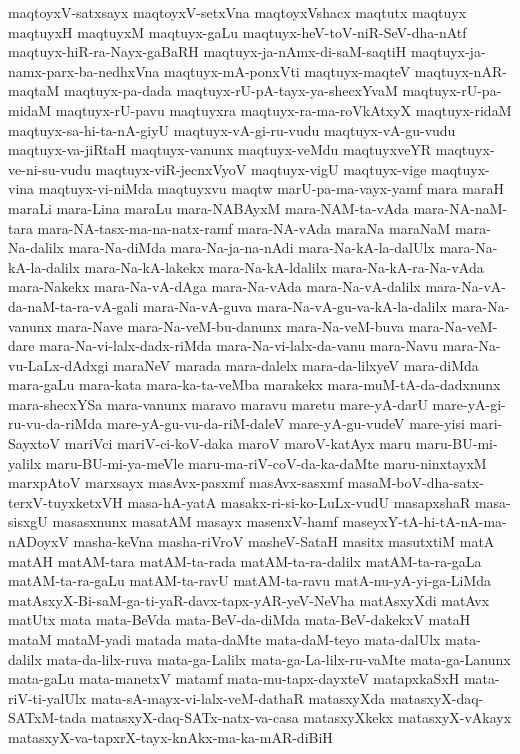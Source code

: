 {maqtoyxV-satxsayx
maqtoyxV-setxVna
maqtoyxVshacx
maqtutx
maqtuyx
maqtuyxH
maqtuyxM
maqtuyx-gaLu
maqtuyx-heV-toV-niR-SeV-dha-nAtf
maqtuyx-hiR-ra-Nayx-gaBaRH
maqtuyx-ja-nAmx-di-saM-saqtiH
maqtuyx-ja-namx-parx-ba-nedhxVna
maqtuyx-mA-ponxVti
maqtuyx-maqteV
maqtuyx-nAR-maqtaM
maqtuyx-pa-dada
maqtuyx-rU-pA-tayx-ya-shecxYvaM
maqtuyx-rU-pa-midaM
maqtuyx-rU-pavu
maqtuyxra
maqtuyx-ra-ma-roVkAtxyX
maqtuyx-ridaM
maqtuyx-sa-hi-ta-nA-giyU
maqtuyx-vA-gi-ru-vudu
maqtuyx-vA-gu-vudu
maqtuyx-va-jiRtaH
maqtuyx-vanunx
maqtuyx-veMdu
maqtuyxveYR
maqtuyx-ve-ni-su-vudu
maqtuyx-viR-jecnxVyoV
maqtuyx-vigU
maqtuyx-vige
maqtuyx-vina
maqtuyx-vi-niMda
maqtuyxvu
maqtw
marU-pa-ma-vayx-yamf
mara
maraH
maraLi
mara-Lina
maraLu
mara-NABAyxM
mara-NAM-ta-vAda
mara-NA-naM-tara
mara-NA-tasx-ma-na-natx-ramf
mara-NA-vAda
maraNa
maraNaM
mara-Na-dalilx
mara-Na-diMda
mara-Na-ja-na-nAdi
mara-Na-kA-la-dalUlx
mara-Na-kA-la-dalilx
mara-Na-kA-lakekx
mara-Na-kA-ldalilx
mara-Na-kA-ra-Na-vAda
mara-Nakekx
mara-Na-vA-dAga
mara-Na-vAda
mara-Na-vA-dalilx
mara-Na-vA-da-naM-ta-ra-vA-gali
mara-Na-vA-guva
mara-Na-vA-gu-va-kA-la-dalilx
mara-Na-vanunx
mara-Nave
mara-Na-veM-bu-danunx
mara-Na-veM-buva
mara-Na-veM-dare
mara-Na-vi-lalx-dadx-riMda
mara-Na-vi-lalx-da-vanu
mara-Navu
mara-Na-vu-LaLx-dAdxgi
maraNeV
marada
mara-dalelx
mara-da-lilxyeV
mara-diMda
mara-gaLu
mara-kata
mara-ka-ta-veMba
marakekx
mara-muM-tA-da-dadxnunx
mara-shecxYSa
mara-vanunx
maravo
maravu
maretu
mare-yA-darU
mare-yA-gi-ru-vu-da-riMda
mare-yA-gu-vu-da-riM-daleV
mare-yA-gu-vudeV
mare-yisi
mari-SayxtoV
mariVci
mariV-ci-koV-daka
maroV
maroV-katAyx
maru
maru-BU-mi-yalilx
maru-BU-mi-ya-meVle
maru-ma-riV-coV-da-ka-daMte
maru-ninxtayxM
marxpAtoV
marxsayx
masAvx-pasxmf
masAvx-sasxmf
masaM-boV-dha-satx-terxV-tuyxketxVH
masa-hA-yatA
masakx-ri-si-ko-LuLx-vudU
masapxshaR
masa-sisxgU
masasxnunx
masatAM
masayx
masenxV-hamf
maseyxY-tA-hi-tA-nA-ma-nADoyxV
masha-keVna
masha-riVroV
masheV-SataH
masitx
masutxtiM
matA
matAH
matAM-tara
matAM-ta-rada
matAM-ta-ra-dalilx
matAM-ta-ra-gaLa
matAM-ta-ra-gaLu
matAM-ta-ravU
matAM-ta-ravu
matA-nu-yA-yi-ga-LiMda
matAsxyX-Bi-saM-ga-ti-yaR-davx-tapx-yAR-yeV-NeVha
matAsxyXdi
matAvx
matUtx
mata
mata-BeVda
mata-BeV-da-diMda
mata-BeV-dakekxV
mataH
mataM
mataM-yadi
matada
mata-daMte
mata-daM-teyo
mata-dalUlx
mata-dalilx
mata-da-lilx-ruva
mata-ga-Lalilx
mata-ga-La-lilx-ru-vaMte
mata-ga-Lanunx
mata-gaLu
mata-manetxV
matamf
mata-mu-tapx-dayxteV
matapxkaSxH
mata-riV-ti-yalUlx
mata-sA-mayx-vi-lalx-veM-dathaR
matasxyXda
matasxyX-daq-SATxM-tada
matasxyX-daq-SATx-natx-va-casa
matasxyXkekx
matasxyX-vAkayx
matasxyX-va-tapxrX-tayx-knAkx-ma-ka-mAR-diBiH
}

